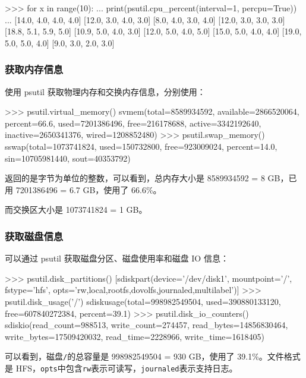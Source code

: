 \begin{pythoncode}
>>> for x in range(10):
...     print(psutil.cpu_percent(interval=1, percpu=True))
... 
[14.0, 4.0, 4.0, 4.0]
[12.0, 3.0, 4.0, 3.0]
[8.0, 4.0, 3.0, 4.0]
[12.0, 3.0, 3.0, 3.0]
[18.8, 5.1, 5.9, 5.0]
[10.9, 5.0, 4.0, 3.0]
[12.0, 5.0, 4.0, 5.0]
[15.0, 5.0, 4.0, 4.0]
[19.0, 5.0, 5.0, 4.0]
[9.0, 3.0, 2.0, 3.0]
\end{pythoncode}

\hypertarget{ux83b7ux53d6ux5185ux5b58ux4fe1ux606f}{%
\subsubsection{获取内存信息}\label{ux83b7ux53d6ux5185ux5b58ux4fe1ux606f}}

使用 psutil 获取物理内存和交换内存信息，分别使用：

\begin{pythoncode}
>>> psutil.virtual_memory()
svmem(total=8589934592, available=2866520064, percent=66.6, used=7201386496, free=216178688, active=3342192640, inactive=2650341376, wired=1208852480)
>>> psutil.swap_memory()
sswap(total=1073741824, used=150732800, free=923009024, percent=14.0, sin=10705981440, sout=40353792)
\end{pythoncode}

返回的是字节为单位的整数，可以看到，总内存大小是 8589934592 = 8 GB，已用
7201386496 = 6.7 GB，使用了 66.6\%。

而交换区大小是 1073741824 = 1 GB。

\hypertarget{ux83b7ux53d6ux78c1ux76d8ux4fe1ux606f}{%
\subsubsection{获取磁盘信息}\label{ux83b7ux53d6ux78c1ux76d8ux4fe1ux606f}}

可以通过 psutil 获取磁盘分区、磁盘使用率和磁盘 IO 信息：

\begin{pythoncode}
>>> psutil.disk_partitions() 
[sdiskpart(device='/dev/disk1', mountpoint='/', fstype='hfs', opts='rw,local,rootfs,dovolfs,journaled,multilabel')]
>>> psutil.disk_usage('/') 
sdiskusage(total=998982549504, used=390880133120, free=607840272384, percent=39.1)
>>> psutil.disk_io_counters() 
sdiskio(read_count=988513, write_count=274457, read_bytes=14856830464, write_bytes=17509420032, read_time=2228966, write_time=1618405)
\end{pythoncode}

可以看到，磁盘\texttt{\textquotesingle{}/\textquotesingle{}}的总容量是
998982549504 = 930 GB，使用了 39.1\%。文件格式是
HFS，\texttt{opts}中包含\texttt{rw}表示可读写，\texttt{journaled}表示支持日志。

